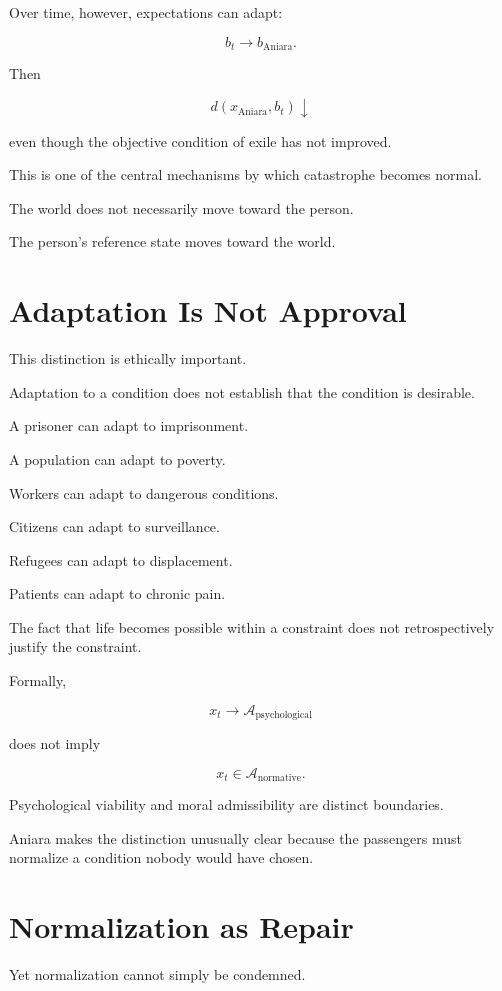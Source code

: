 \documentclass[11pt,oneside]{book}
\theoremstyle{definition}
\theoremstyle{remark}
\newcommand{\A}{\mathcal{A}}
\begin{document}
Over time, however, expectations can adapt:

\[
b_t
\rightarrow
b_{\mathrm{Aniara}}.
\]

Then

\[
d(x_{\mathrm{Aniara}},b_t)
\downarrow
\]

even though the objective condition of exile has not improved.

This is one of the central mechanisms by which catastrophe becomes normal.

The world does not necessarily move toward the person.

The person's reference state moves toward the world.

\section{Adaptation Is Not Approval}

This distinction is ethically important.

Adaptation to a condition does not establish that the condition is desirable.

A prisoner can adapt to imprisonment.

A population can adapt to poverty.

Workers can adapt to dangerous conditions.

Citizens can adapt to surveillance.

Refugees can adapt to displacement.

Patients can adapt to chronic pain.

The fact that life becomes possible within a constraint does not retrospectively justify the constraint.

Formally,

\[
x_t\rightarrow\A_{\mathrm{psychological}}
\]

does not imply

\[
x_t\in\A_{\mathrm{normative}}.
\]

Psychological viability and moral admissibility are distinct boundaries.

Aniara makes the distinction unusually clear because the passengers must normalize a condition nobody would have chosen.

\section{Normalization as Repair}

Yet normalization cannot simply be condemned.
\end{document}
